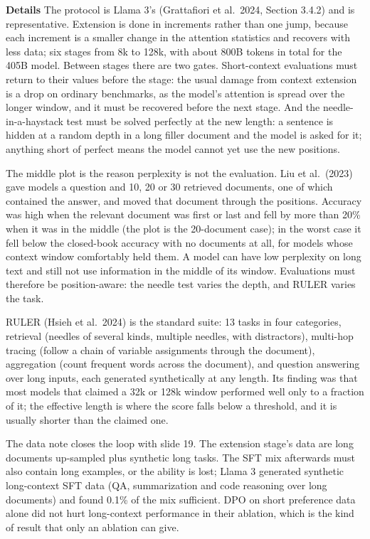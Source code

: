 \documentclass[11pt,letterpaper]{article}
\newcommand{\para}[1]{\medskip\noindent\textbf{#1}\quad}
\begin{document}
\para{Details} The protocol is Llama 3's (Grattafiori et al.\ 2024, Section 3.4.2) and is representative. Extension is done in increments rather than one jump, because each increment is a smaller change in the attention statistics and recovers with less data; six stages from 8k to 128k, with about 800B tokens in total for the 405B model. Between stages there are two gates. Short-context evaluations must return to their values before the stage: the usual damage from context extension is a drop on ordinary benchmarks, as the model's attention is spread over the longer window, and it must be recovered before the next stage. And the needle-in-a-haystack test must be solved perfectly at the new length: a sentence is hidden at a random depth in a long filler document and the model is asked for it; anything short of perfect means the model cannot yet use the new positions.

The middle plot is the reason perplexity is not the evaluation. Liu et al.\ (2023) gave models a question and 10, 20 or 30 retrieved documents, one of which contained the answer, and moved that document through the positions. Accuracy was high when the relevant document was first or last and fell by more than 20\% when it was in the middle (the plot is the 20-document case); in the worst case it fell below the closed-book accuracy with no documents at all, for models whose context window comfortably held them. A model can have low perplexity on long text and still not use information in the middle of its window. Evaluations must therefore be position-aware: the needle test varies the depth, and RULER varies the task.

RULER (Hsieh et al.\ 2024) is the standard suite: 13 tasks in four categories, retrieval (needles of several kinds, multiple needles, with distractors), multi-hop tracing (follow a chain of variable assignments through the document), aggregation (count frequent words across the document), and question answering over long inputs, each generated synthetically at any length. Its finding was that most models that claimed a 32k or 128k window performed well only to a fraction of it; the effective length is where the score falls below a threshold, and it is usually shorter than the claimed one.

The data note closes the loop with slide 19. The extension stage's data are long documents up-sampled plus synthetic long tasks. The SFT mix afterwards must also contain long examples, or the ability is lost; Llama 3 generated synthetic long-context SFT data (QA, summarization and code reasoning over long documents) and found 0.1\% of the mix sufficient. DPO on short preference data alone did not hurt long-context performance in their ablation, which is the kind of result that only an ablation can give.
\end{document}
